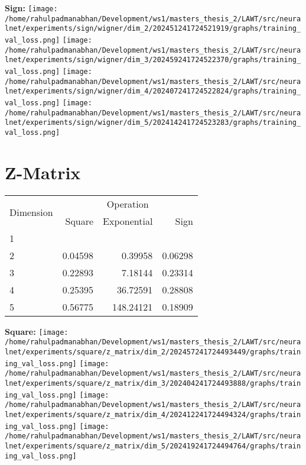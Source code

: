 \documentclass{article}
\begin{document}
\textbf{Sign:}
\texttt{[image: /home/rahulpadmanabhan/Development/ws1/masters\_thesis\_2/LAWT/src/neuralnet/experiments/sign/wigner/dim\_2/202451241724521919/graphs/training\_val\_loss.png]}
\texttt{[image: /home/rahulpadmanabhan/Development/ws1/masters\_thesis\_2/LAWT/src/neuralnet/experiments/sign/wigner/dim\_3/202459241724522370/graphs/training\_val\_loss.png]}
\texttt{[image: /home/rahulpadmanabhan/Development/ws1/masters\_thesis\_2/LAWT/src/neuralnet/experiments/sign/wigner/dim\_4/202407241724522824/graphs/training\_val\_loss.png]}
\texttt{[image: /home/rahulpadmanabhan/Development/ws1/masters\_thesis\_2/LAWT/src/neuralnet/experiments/sign/wigner/dim\_5/202414241724523283/graphs/training\_val\_loss.png]}



\pagebreak
\section{Z-Matrix}
\begin{tabular}{@{}lrrr@{}}
\toprule
\multirow{2}{*}{Dimension} & \multicolumn{3}{c}{Operation} \\
\cmidrule(l){2-4}
& Square & Exponential & Sign \\
\midrule
1 & & & \\
2 & 0.04598 & 0.39958 & 0.06298 \\
3 & 0.22893 & 7.18144 & 0.23314 \\
4 & 0.25395 & 36.72591 & 0.28808 \\
5 & 0.56775 & 148.24121 & 0.18909 \\
\bottomrule
\end{tabular}

\textbf{Square:}
\texttt{[image: /home/rahulpadmanabhan/Development/ws1/masters\_thesis\_2/LAWT/src/neuralnet/experiments/square/z\_matrix/dim\_2/202457241724493449/graphs/training\_val\_loss.png]}
\texttt{[image: /home/rahulpadmanabhan/Development/ws1/masters\_thesis\_2/LAWT/src/neuralnet/experiments/square/z\_matrix/dim\_3/202404241724493888/graphs/training\_val\_loss.png]}
\texttt{[image: /home/rahulpadmanabhan/Development/ws1/masters\_thesis\_2/LAWT/src/neuralnet/experiments/square/z\_matrix/dim\_4/202412241724494324/graphs/training\_val\_loss.png]}
\texttt{[image: /home/rahulpadmanabhan/Development/ws1/masters\_thesis\_2/LAWT/src/neuralnet/experiments/square/z\_matrix/dim\_5/202419241724494764/graphs/training\_val\_loss.png]}
\end{document}
